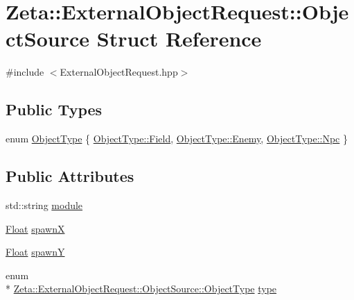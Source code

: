 \hypertarget{structZeta_1_1ExternalObjectRequest_1_1ObjectSource}{\section{Zeta\+:\+:External\+Object\+Request\+:\+:Object\+Source Struct Reference}
\label{structZeta_1_1ExternalObjectRequest_1_1ObjectSource}
}


{\ttfamily \#include $<$External\+Object\+Request.\+hpp$>$}

\subsection*{Public Types}
\begin{DoxyCompactItemize}
\item 
enum \hyperlink{structZeta_1_1ExternalObjectRequest_1_1ObjectSource_adca92b0095acf659c6ed69206f8ecf83}{Object\+Type} \{ \hyperlink{structZeta_1_1ExternalObjectRequest_1_1ObjectSource_adca92b0095acf659c6ed69206f8ecf83a6f16a5f8ff5d75ab84c018adacdfcbb7}{Object\+Type\+::\+Field}, 
\hyperlink{structZeta_1_1ExternalObjectRequest_1_1ObjectSource_adca92b0095acf659c6ed69206f8ecf83a8c6d21187fb58b7a079d70030686b33e}{Object\+Type\+::\+Enemy}, 
\hyperlink{structZeta_1_1ExternalObjectRequest_1_1ObjectSource_adca92b0095acf659c6ed69206f8ecf83aaa1c4bfa703b52579a551e9d7d35dced}{Object\+Type\+::\+Npc}
 \}
\end{DoxyCompactItemize}
\subsection*{Public Attributes}
\begin{DoxyCompactItemize}
\item 
std\+::string \hyperlink{structZeta_1_1ExternalObjectRequest_1_1ObjectSource_ad6c259786b43d77567f15593dc471788}{module}
\item 
\hyperlink{namespaceZeta_a1e0a1265f9b3bd3075fb0fabd39088ba}{Float} \hyperlink{structZeta_1_1ExternalObjectRequest_1_1ObjectSource_ab7107419e7d1e42cb5ac7b6afec85bff}{spawn\+X}
\item 
\hyperlink{namespaceZeta_a1e0a1265f9b3bd3075fb0fabd39088ba}{Float} \hyperlink{structZeta_1_1ExternalObjectRequest_1_1ObjectSource_a96ac7d56e90fcbd88a94fffd4a4a52a8}{spawn\+Y}
\item 
enum \\*
\hyperlink{structZeta_1_1ExternalObjectRequest_1_1ObjectSource_adca92b0095acf659c6ed69206f8ecf83}{Zeta\+::\+External\+Object\+Request\+::\+Object\+Source\+::\+Object\+Type} \hyperlink{structZeta_1_1ExternalObjectRequest_1_1ObjectSource_ab89fa828c4b926fb79e40fcf706daf60}{type}
\end{DoxyCompactItemize}



